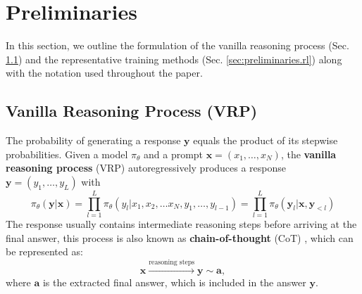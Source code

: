 \section{Preliminaries}
\label{sec:preliminaries}

In this section, we outline the formulation of the vanilla reasoning process (Sec. \ref{sec:preliminaries.vrp}) and the representative training methods (Sec. \ref{sec:preliminaries.rl}) along with the notation used throughout the paper. 

\subsection{Vanilla Reasoning Process (VRP)}
\label{sec:preliminaries.vrp}
The probability of generating a response $\mathbf{y}$ equals the product of its stepwise probabilities. Given a model $\pi_\theta$ and a prompt $\mathbf{x}=(x_1,\dots,x_N)$, the \textbf{vanilla reasoning process} (VRP) autoregressively produces a response $\mathbf{y}=(y_1,\dots,y_L)$ with
\begin{equation*}
    \pi_\theta(\mathbf{y}|\mathbf{x}) = \prod\limits_{l=1}^{L} \pi_\theta(y_l|x_1, x_2, \ldots x_N, y_1, \ldots, y_{l-1})
    = \prod\limits_{l=1}^{L} \pi_\theta(\mathbf{y}_{l} | \mathbf{x}, \mathbf{y}_{<l})
\end{equation*}
The response usually contains intermediate reasoning steps before arriving at the final answer, this process is also known as \textbf{chain-of-thought} (CoT) \citep{wei2022chain}, which can be represented as:
\begin{equation}
    \mathbf{x} 
    \xrightarrow{\text{reasoning steps}} \mathbf{y} 
    \sim
    \mathbf{a},
    \label{eq:cot}
\end{equation}
where $\mathbf{a}$ is the extracted final answer, which is included in the answer $\mathbf{y}$.


